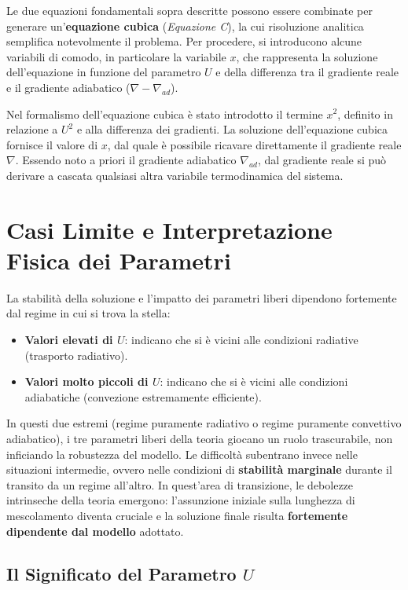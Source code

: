 Le due equazioni fondamentali sopra descritte possono essere combinate per generare un'\textbf{equazione cubica} (\textit{Equazione C}), la cui risoluzione analitica semplifica notevolmente il problema. Per procedere, si introducono alcune variabili di comodo, in particolare la variabile $x$, che rappresenta la soluzione dell'equazione in funzione del parametro $U$ e della differenza tra il gradiente reale e il gradiente adiabatico ($\nabla - \nabla_{ad}$).

Nel formalismo dell'equazione cubica è stato introdotto il termine $x^2$, definito in relazione a $U^2$ e alla differenza dei gradienti. La soluzione dell'equazione cubica fornisce il valore di $x$, dal quale è possibile ricavare direttamente il gradiente reale $\nabla$. Essendo noto a priori il gradiente adiabatico $\nabla_{ad}$, dal gradiente reale si può derivare a cascata qualsiasi altra variabile termodinamica del sistema.

\section{Casi Limite e Interpretazione Fisica dei Parametri}

La stabilità della soluzione e l'impatto dei parametri liberi dipendono fortemente dal regime in cui si trova la stella:
\begin{itemize}
\item \textbf{Valori elevati di $U$}: indicano che si è vicini alle condizioni radiative (trasporto radiativo).
\item \textbf{Valori molto piccoli di $U$}: indicano che si è vicini alle condizioni adiabatiche (convezione estremamente efficiente).
\end{itemize}
In questi due estremi (regime puramente radiativo o regime puramente convettivo adiabatico), i tre parametri liberi della teoria giocano un ruolo trascurabile, non inficiando la robustezza del modello. Le difficoltà subentrano invece nelle situazioni intermedie, ovvero nelle condizioni di \textbf{stabilità marginale} durante il transito da un regime all'altro. In quest'area di transizione, le debolezze intrinseche della teoria emergono: l'assunzione iniziale sulla lunghezza di mescolamento diventa cruciale e la soluzione finale risulta \textbf{fortemente dipendente dal modello} adottato.

\subsection{Il Significato del Parametro $U$}

